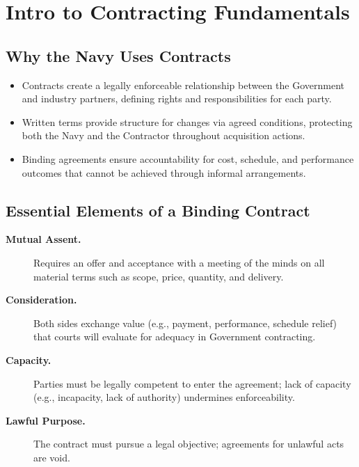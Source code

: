 \documentclass[../main.tex]{subfiles}
\begin{document}

\section{Intro to Contracting Fundamentals}
\subsection{Why the Navy Uses Contracts}
\begin{itemize}
  \item Contracts create a legally enforceable relationship between the Government and industry partners, defining rights and responsibilities for each party.
  \item Written terms provide structure for changes via agreed conditions, protecting both the Navy and the Contractor throughout acquisition actions.
  \item Binding agreements ensure accountability for cost, schedule, and performance outcomes that cannot be achieved through informal arrangements.
\end{itemize}

\subsection{Essential Elements of a Binding Contract}
\begin{description}
  \item[\textbf{Mutual Assent.}] Requires an offer and acceptance with a meeting of the minds on all material terms such as scope, price, quantity, and delivery.
  \item[\textbf{Consideration.}] Both sides exchange value (e.g., payment, performance, schedule relief) that courts will evaluate for adequacy in Government contracting.
  \item[\textbf{Capacity.}] Parties must be legally competent to enter the agreement; lack of capacity (e.g., incapacity, lack of authority) undermines enforceability.
  \item[\textbf{Lawful Purpose.}] The contract must pursue a legal objective; agreements for unlawful acts are void.
\end{description}
\end{document}
